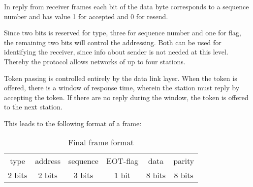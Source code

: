 In reply from receiver frames each bit of the data byte corresponds to a
sequence number and has value 1 for accepted and 0 for resend.

Since two bits is reserved for type, three for sequence number and one for flag,
the remaining two bits will control the addressing. Both can be used
for identifying the receiver, since info about sender is not needed at this
level. Thereby the protocol allows networks of up to four stations.

Token passing is controlled entirely by the data link layer. When the token is
offered, there is a window of response time, wherein the station must reply by accepting
the token. If there are no reply during the window, the token is offered to the
next station. 

This leads to the following format of a frame: 

\begin{table}[htb]
 \centering
 \begin{tabular}{|c|c|c|c|c|c|}
  \hline
  type & address & sequence & EOT-flag & data & parity \\
  2 bits & 2 bits & 3 bits & 1 bit & 8 bits & 8 bits\\
  \hline
 \end{tabular}
 \caption{Final frame format}
 \label{tab:final_frame_format}
\end{table}
